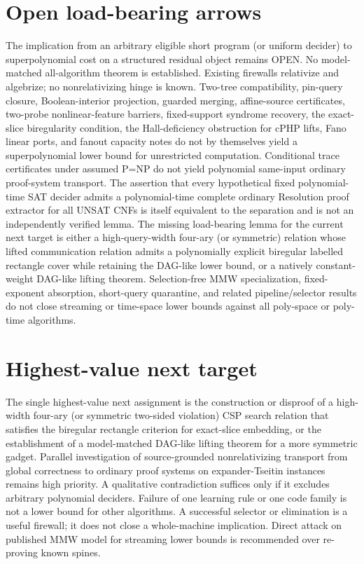 \documentclass[11pt]{article}
\begin{document}
\section{Open load-bearing arrows}
The implication from an arbitrary eligible short program (or uniform decider) to superpolynomial cost on a structured residual object remains OPEN. No model-matched all-algorithm theorem is established. Existing firewalls relativize and algebrize; no nonrelativizing hinge is known. Two-tree compatibility, pin-query closure, Boolean-interior projection, guarded merging, affine-source certificates, two-probe nonlinear-feature barriers, fixed-support syndrome recovery, the exact-slice biregularity condition, the Hall-deficiency obstruction for cPHP lifts, Fano linear ports, and fanout capacity notes do not by themselves yield a superpolynomial lower bound for unrestricted computation. Conditional trace certificates under assumed P=NP do not yield polynomial same-input ordinary proof-system transport. The assertion that every hypothetical fixed polynomial-time SAT decider admits a polynomial-time complete ordinary Resolution proof extractor for all UNSAT CNFs is itself equivalent to the separation and is not an independently verified lemma. The missing load-bearing lemma for the current next target is either a high-query-width four-ary (or symmetric) relation whose lifted communication relation admits a polynomially explicit biregular labelled rectangle cover while retaining the DAG-like lower bound, or a natively constant-weight DAG-like lifting theorem. Selection-free MMW specialization, fixed-exponent absorption, short-query quarantine, and related pipeline/selector results do not close streaming or time-space lower bounds against all poly-space or poly-time algorithms.

\section{Highest-value next target}
The single highest-value next assignment is the construction or disproof of a high-width four-ary (or symmetric two-sided violation) CSP search relation that satisfies the biregular rectangle criterion for exact-slice embedding, or the establishment of a model-matched DAG-like lifting theorem for a more symmetric gadget. Parallel investigation of source-grounded nonrelativizing transport from global correctness to ordinary proof systems on expander-Tseitin instances remains high priority. A qualitative contradiction suffices only if it excludes arbitrary polynomial deciders. Failure of one learning rule or one code family is not a lower bound for other algorithms. A successful selector or elimination is a useful firewall; it does not close a whole-machine implication. Direct attack on published MMW model for streaming lower bounds is recommended over re-proving known spines.
\end{document}
